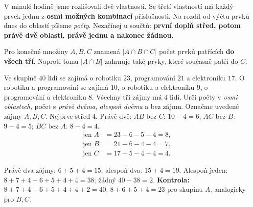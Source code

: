 \documentclass[11pt,a4paper]{article}
\begin{document}
V minulé hodině jsme rozlišovali dvě vlastnosti. Se třetí vlastností
má každý prvek jednu z \textbf{osmi možných kombinací} příslušnosti.
Na rozdíl od výčtu prvků dnes do oblastí píšeme \emph{počty}.
Nezačínej u součtů: \textbf{první doplň střed, potom právě dvě oblasti,
právě jednu a nakonec žádnou.}

\begin{definiceBox}[title={Definice - Průnik tří množin}]
Pro konečné množiny $A,B,C$ znamená $|A\cap B\cap C|$ počet prvků
patřících \textbf{do všech tří}. Naproti tomu $|A\cap B|$ zahrnuje také
prvky, které současně patří do $C$.
\end{definiceBox}

\begin{prikladReseniBox}[title={Příklad 1}]
Ve skupině $40$ lidí se zajímá o robotiku $23$, programování $21$
a elektroniku $17$. O robotiku a programování se zajímá $10$,
o robotiku a elektroniku $9$, o programování a elektroniku $8$.
Všechny tři zájmy má $4$ lidí. Urči počty v \emph{osmi oblastech},
počet s \emph{právě dvěma}, \emph{alespoň dvěma} a bez zájmu.
\tcblower
Označme uvedené zájmy $A,B,C$. Nejprve střed $4$.
Právě dvě: $AB$ bez $C$: $10-4=6$;
$AC$ bez $B$: $9-4=5$; $BC$ bez $A$: $8-4=4$.
\[
\begin{aligned}
\text{jen }A&=23-6-5-4=8,\\
\text{jen }B&=21-6-4-4=7,\\
\text{jen }C&=17-5-4-4=4.
\end{aligned}
\]
\begin{center}
\end{center}
Právě dva zájmy: $6+5+4=15$; alespoň dva: $15+4=19$.
Alespoň jeden: $8+7+4+6+5+4+4=38$; žádný $40-38=2$.
\textbf{Kontrola:} $8+7+4+6+5+4+4+2=40$,
$8+6+5+4=23$ pro skupinu $A$, analogicky pro $B,C$.
\end{prikladReseniBox}

\end{document}
